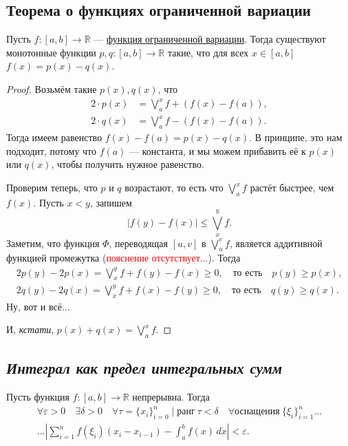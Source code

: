 \subsection{\color{red} Теорема о функциях ограниченной вариации}

\begin{theorem}
	Пусть \(f\colon [a, b] \to \mathbb{R}\) --- \hyperlink{orgvar}{функция ограниченной вариации}. Тогда существуют монотонные функции \(p, q\colon [a, b] \to \mathbb{R}\) такие, что для всех \(x \in [a, b]\) \(f(x) = p(x) - q(x)\).
\end{theorem}
\begin{proof}
	Возьмём такие \(p(x), q(x)\), что
	\begin{align*}
		2 \cdot p(x) &= \bigvee_a^x f + (f(x) - f(a)), \\
		2 \cdot q(x) &= \bigvee_a^x f - (f(x) - f(a)).
	\end{align*}
	Тогда имеем равенство \(f(x) - f(a) = p(x) - q(x)\). В принципе, это нам подходит, потому что \(f(a)\) --- константа, и мы можем прибавить её к \(p(x)\) или \(q(x)\), чтобы получить нужное равенство.
	
	Проверим теперь, что \(p\) и \(q\) возрастают, то есть что \(\bigvee_a^x f\) растёт быстрее, чем \(f(x)\). Пусть \(x < y\), запишем \[
	|f(y) - f(x)| \leqslant \bigvee_x^y f.
	\]
	Заметим, что функция \(\Phi\), переводящая \([u, v]\) в \(\bigvee_u^v f\), является аддитивной функцией промежутка (\textcolor{red}{пояснение отсутствует...}). Тогда
	\begin{gather*}
		2p(y) - 2p(x) = \bigvee_x^y f + f(y) - f(x) \geqslant 0, \quad \text{то есть} \quad p(y) \geqslant p(x), \\
		2q(y) - 2q(x) = \bigvee_x^y f + f(x) - f(y) \geqslant 0, \quad \text{то есть} \quad q(y) \geqslant q(x).
	\end{gather*}
	Ну, вот и всё...
	
	И, \textit{кстати}, \(p(x) + q(x) = \bigvee_a^x f\).
\end{proof}

\subsection{\itshape Интеграл как предел интегральных сумм}

\begin{theorem}
	Пусть функция \(f \colon [a, b] \to \mathbb{R}\) непрерывна. Тогда
	\begin{gather*}
		\forall \varepsilon > 0 \quad \exists \delta > 0 \quad \forall \tau = \{x_i\}_{i = 0}^n \mid \text{ранг} \ \tau < \delta \quad \forall \text{оснащения} \ \{\xi_i\}_{i = 1}^n \ldots \\
		\ldots \left|\sum_{i = 1}^n f(\xi_i) (x_i - x_{i - 1}) - \int_a^b f(x) \, dx \right| < \varepsilon.
	\end{gather*}
\end{theorem}

